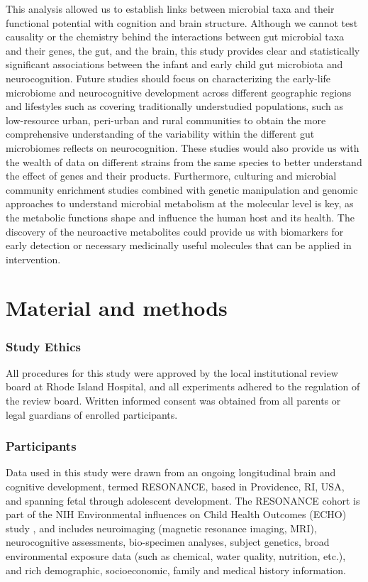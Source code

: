 \documentclass{article}
\begin{document}
This analysis allowed us to establish links between microbial taxa and
their functional potential with cognition and brain structure. Although
we cannot test causality or the chemistry behind the interactions
between gut microbial taxa and their genes, the gut, and the brain,
this study provides clear and statistically significant associations
between the infant and early child gut microbiota and neurocognition.
Future studies should focus on characterizing the early-life microbiome
and neurocognitive development across different geographic regions
and lifestyles such as covering traditionally understudied populations,
such as low-resource urban, peri-urban and rural communities
to obtain the more comprehensive understanding of the
variability within the different gut microbiomes reflects on
neurocognition. These studies would also provide us with the wealth of
data on different strains from the same species to better understand the
effect of genes and their products. Furthermore, culturing and microbial
community enrichment studies combined with genetic manipulation and
genomic approaches to understand microbial metabolism at the molecular
level is key, as the metabolic functions shape and influence the
human host and its health. The discovery of the neuroactive metabolites
could provide us with biomarkers for early detection or necessary
medicinally useful molecules that can be applied in intervention.

\section*{Material and methods}

\subsubsection*{Study Ethics}

All procedures for this study were approved by the local institutional
review board at Rhode Island Hospital, and all experiments adhered to
the regulation of the review board. Written informed consent was
obtained from all parents or legal guardians of enrolled participants.

\subsubsection*{Participants}

Data used in this study were drawn from an ongoing longitudinal
brain and cognitive development, termed RESONANCE, based in Providence, RI, USA,
and spanning fetal through adolescent development. The
RESONANCE cohort is part of the NIH Environmental influences
on Child Health Outcomes (ECHO) study
\cite{forrestAdvancingScienceChildren2018,gillmanEnvironmentalInfluencesChild2018},
and includes neuroimaging (magnetic
resonance imaging, MRI), neurocognitive assessments, bio-specimen
analyses, subject genetics, broad environmental exposure data
(such as chemical, water quality, nutrition, etc.), and
rich demographic, socioeconomic, family and medical history information.
\end{document}
